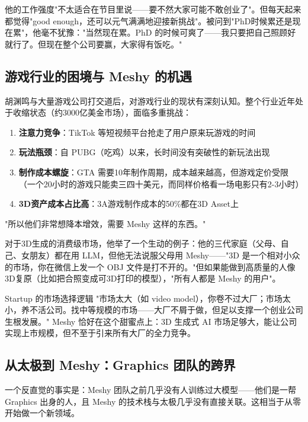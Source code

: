 \documentclass[a4paper]{article}
\begin{document}
他的工作强度"不太适合在节目里说——要不然大家可能不敢创业了"。但每天起来都觉得"good enough，还可以元气满满地迎接新挑战"。被问到"PhD时候累还是现在累"，他毫不犹豫："当然现在累。PhD 的时候可爽了——我只要把自己照顾好就行了。但现在整个公司要赢，大家得有饭吃。"

\subsection{游戏行业的困境与 Meshy 的机遇}

胡渊鸣与大量游戏公司打交道后，对游戏行业的现状有深刻认知。整个行业近年处于收缩状态（约3000亿美金市场），面临多重挑战：

\begin{enumerate}
\item \textbf{注意力竞争}：TikTok 等短视频平台抢走了用户原来玩游戏的时间
\item \textbf{玩法瓶颈}：自 PUBG（吃鸡）以来，长时间没有突破性的新玩法出现
\item \textbf{制作成本螺旋}：GTA 需要10年制作周期，成本越来越高，但游戏定价受限（一个20小时的游戏只能卖三四十美元，而同样价格看一场电影只有2-3小时）
\item \textbf{3D资产成本占比高}：3A游戏制作成本的50\%都在3D Asset上
\end{enumerate}

"所以他们非常想降本增效，需要 Meshy 这样的东西。"

对于3D生成的消费级市场，他举了一个生动的例子：他的三代家庭（父母、自己、女朋友）都在用 LLM，但他无法说服父母用 Meshy——"3D 是一个相对小众的市场，你在微信上发一个 OBJ 文件是打不开的。"但如果能做到高质量的人像3D复原（比如把合照变成可3D打印的模型），"所有人都是 Meshy 的用户"。

\begin{knowledgebox}{Startup 的市场选择逻辑}
"市场太大（如 video model），你卷不过大厂；市场太小，养不活公司。找中等规模的市场——大厂不屑于做，但足以支撑一个创业公司生根发展。" Meshy 恰好在这个甜蜜点上：3D 生成式 AI 市场足够大，能让公司实现上市规模，但不至于引来所有大厂的全力竞争。
\end{knowledgebox}

\subsection{从太极到 Meshy：Graphics 团队的跨界}

一个反直觉的事实是：Meshy 团队之前几乎没有人训练过大模型——他们是一帮 Graphics 出身的人，且 Meshy 的技术栈与太极几乎没有直接关联。这相当于从零开始做一个新领域。
\end{document}
